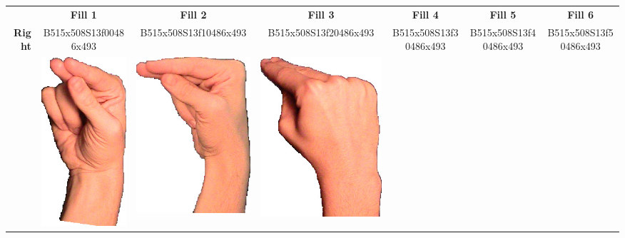 \documentclass{article}
\begin{document}
\begin{center}
\begin{tabular}{r*{6}{c}}
&\textbf{Fill 1}&\textbf{Fill 2}&\textbf{Fill 3}&\textbf{Fill 4}&\textbf{Fill 5}&\textbf{Fill 6}\\
\multirow{2}{*}{\textbf{Right}}&
B515x508S13f00486x493&
B515x508S13f10486x493&
B515x508S13f20486x493&
B515x508S13f30486x493&
B515x508S13f40486x493&
B515x508S13f50486x493\\
&
\includegraphics[scale=0.1]{images/03-11-1.jpg}&
\includegraphics[scale=0.1]{images/03-11-2.jpg}&
\includegraphics[scale=0.1]{images/03-11-3.jpg}&

\end{tabular}
\end{center}
\end{document}
